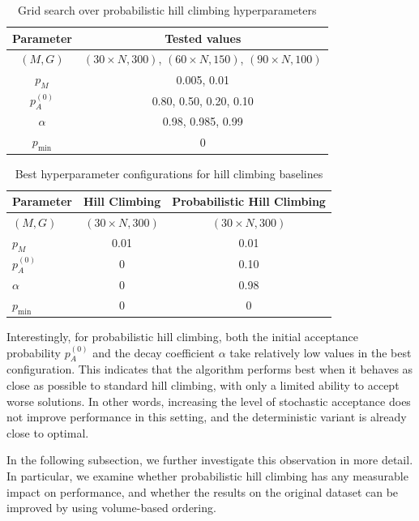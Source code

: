 \begin{table}[htbp]
\centering
\caption{Grid search over probabilistic hill climbing hyperparameters}
\label{tab:phc-parameters}
\begin{tabular}{|c|c|}
\hline
Parameter & Tested values \\ \hline
$(M,G)$ & $(30 \times N, 300)$, $(60 \times N, 150)$, $(90 \times N, 100)$ \\ \hline
$p_M$ & 0.005, 0.01 \\ \hline
$p_A^{(0)}$ & 0.80, 0.50, 0.20, 0.10 \\ \hline
$\alpha$ & 0.98, 0.985, 0.99 \\ \hline
$p_{\min}$ & 0 \\ \hline
\end{tabular}
\end{table}

\begin{table}[htbp]
\centering
\caption{Best hyperparameter configurations for hill climbing baselines}
\label{tab:hc-best-config}
\begin{tabular}{|l|c|c|}
\hline
Parameter & Hill Climbing & Probabilistic Hill Climbing \\ \hline
$(M,G)$ & $(30 \times N, 300)$ & $(30 \times N, 300)$ \\ \hline
$p_M$ & 0.01 & 0.01 \\ \hline
$p_A^{(0)}$ & 0 & 0.10 \\ \hline
$\alpha$ & 0 & 0.98 \\ \hline
$p_{\min}$ & 0 & 0 \\ \hline
\end{tabular}
\end{table}

Interestingly, for probabilistic hill climbing, both the initial acceptance probability $p_A^{(0)}$ and the decay coefficient $\alpha$ take relatively low values in the best configuration. 
This indicates that the algorithm performs best when it behaves as close as possible to standard hill climbing, with only a limited ability to accept worse solutions. 
In other words, increasing the level of stochastic acceptance does not improve performance in this setting, and the deterministic variant is already close to optimal.

In the following subsection, we further investigate this observation in more detail. 
In particular, we examine whether probabilistic hill climbing has any measurable impact on performance, and whether the results on the original dataset can be improved by using volume-based ordering.

